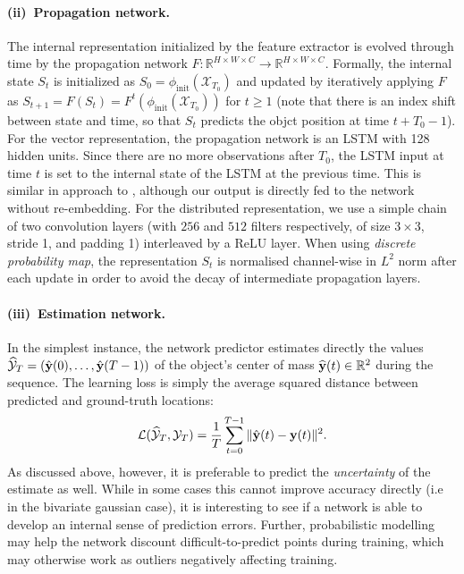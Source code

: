 \paragraph{(ii)~Propagation network.} 
The internal representation initialized by the feature extractor is evolved through time by the propagation network $F : \mathbb{R}^{H\times W\times C} \rightarrow \mathbb{R}^{H\times W\times C}$. Formally, the internal state $S_t$ is initialized as $S_0 = \phi_\text{init}(\mathcal{X}_{T_0})$ and updated by iteratively applying $F$ as $S_{t+1} = F(S_t) = F^{t}(\phi_\text{init}(\mathcal{X}_{T_0}))$ for $t\geq 1$ (note that there is an index shift between state and time, so that $S_t$ predicts the objct position at time $t+T_0-1$). For the vector representation, the propagation network is an LSTM with 128 hidden units. Since there are no more observations after $T_0$, the LSTM input at time $t$ is set to the internal state of the LSTM at the previous time. This is  similar in approach to \cite{cho-al-emnlp14}, although our output is directly fed to the network without re-embedding. For the distributed representation, we use a simple chain of two convolution layers (with $256$ and $512$ filters respectively, of size $3\times3$, stride 1, and padding 1) interleaved by a ReLU layer. When using \textit{discrete probability map}, the representation $S_t$ is normalised channel-wise in $L^2$ norm after each update in order to avoid the decay of intermediate propagation layers.

\paragraph{(iii)~Estimation network.}
In the simplest instance, the network predictor estimates directly the values $\widehat{\mathcal{Y}}_T=(\hat {\mathbf{y}}(0),\dots, \hat {\mathbf{y}}(T-1))$ of the object's center of mass $\widehat{\mathbf{y}}(t)\in\mathbb{R}^2$ during the sequence. The learning loss is simply the average squared distance between predicted and ground-truth locations:
\vnudgeeq
\[
   \losstwo(\widehat{\mathcal{Y}}_T,\mathcal{Y}_T)
   =\frac{1}{T} \sum_{t=0}^{T-1} \| \hat \by(t) - \by(t) \|^2.
\vnudgeeq
\]
As discussed above, however, it is preferable to predict the \emph{uncertainty} of the estimate as well. While in some cases this cannot improve accuracy directly (i.e in the bivariate gaussian case), it is interesting to see if a network is able to develop an internal sense of prediction errors. Further, probabilistic modelling may help the network discount difficult-to-predict points during training, which may otherwise work as outliers negatively affecting training.

